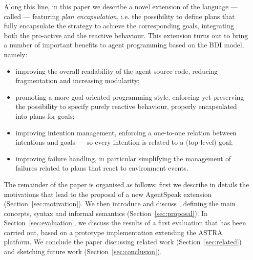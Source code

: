 %
Along this line, in this paper we describe a novel extension of the
{\asl} language --- called {\aser} --- featuring \emph{plan
  encapsulation}, i.e. the possibility to define plans that fully
encapsulate the strategy to achieve the corresponding goals,
integrating both the pro-active and the reactive behaviour.
%
%
This extension turns out to bring a number of important benefits to
agent programming based on the BDI model, namely:
%
\begin{itemize}
\item improving the overall readability of the agent source code,
  reducing fragmentation and increasing modularity;
\item promoting a more goal-oriented programming style, enforcing yet
  preserving the possibility to specify purely reactive behaviour,
  properly encapsulated into plans for goals;
\item improving intention management, enforcing a one-to-one relation
  between intentions and goals --- so every intention is related to a
  (top-level) goal;
\item improving failure handling, in particular simplifying the
  management of failures related to plans that react to environment
  events.
\end{itemize}
%

\noindent The remainder of the paper is organised as follows:
%
first we describe in details the motivations that lead to the proposal
of a new AgentSpeak extension (Section~\ref{sec:motivation}).
%
We then introduce and discuss {\aser}, defining the main concepts,
syntax and informal semantics (Section~\ref{sec:proposal}). %
%
In Section~\ref{sec:evaluation}, we discuss the results of a first evaluation that has been
carried out, based on a prototype implementation extending the ASTRA
platform.
%
We conclude the paper discussing related work
(Section~\ref{sec:related}) and sketching future work
(Section~\ref{sec:conclusion}).


